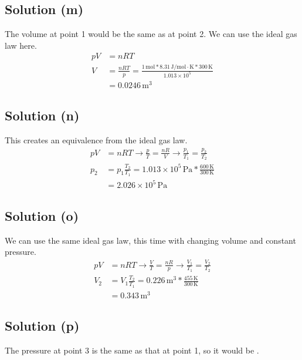\documentclass[12pt]{article}
\newcommand{\E}[1]{\times 10^{#1}}
\begin{document}
        \subsection{Solution (m)}
            The volume at point 1 would be the same as at point 2.
            We can use the ideal gas law here.
            \begin{align}
                pV  &=  nRT\\
                V   &=  \frac{nRT}{p}
                    =   \frac{1\,\unit{\mole} * 8.31\,\unit{\joule/\mole\cdot\kelvin} * 300\,\unit{\kelvin}}{1.013\E{5}}\\
                    &=  \boxed{0.0246\,\unit{\meter^3}}
            \end{align}

        \subsection{Solution (n)}
            This creates an equivalence from the ideal gas law.
            \begin{align}
                pV  &=  nRT \to
                \frac{p}{T} =   \frac{nR}{V} \to
                \frac{p_1}{T_1} =   \frac{p_2}{T_2}\\
                p_2 &=  p_1 \frac{T_2}{T_1}
                    =   1.013\E{5}\,\unit{\pascal} * \frac{600\,\unit{\kelvin}}{300\,\unit{\kelvin}}\\
                    &=  \boxed{2.026\E{5}\,\unit{\pascal}}
            \end{align}

        \subsection{Solution (o)}
            We can use the same ideal gas law, this time with changing volume and constant pressure.
            \begin{align}
                pV  &=  nRT \to
                \frac{V}{T} =   \frac{nR}{p} \to
                \frac{V_1}{T_1} =   \frac{V_2}{T_2}\\
                V_2 &=  V_1 \frac{T_2}{T_1}
                    =   0.226\,\unit{\meter^3} * \frac{455\,\unit{\kelvin}}{300\,\unit{\kelvin}}\\
                    &=  \boxed{0.343\,\unit{\meter^3}}
            \end{align}

        \subsection{Solution (p)}
            The pressure at point 3 is the same as that at point 1, so it would be \boxed{1.013\E{5}\,\unit{\pascal}}.
\end{document}
